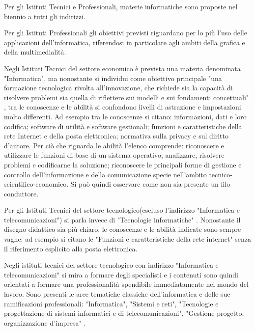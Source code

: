 \documentclass[12pt]{report}
\begin{document}
Per gli Istituti Tecnici e Professionali, materie informatiche sono proposte nel biennio a tutti gli indirizzi.

Per gli Istituti Professionali gli obiettivi previsti riguardano per lo più l'uso delle applicazioni dell'informatica, riferendosi in particolare agli ambiti della grafica e della multimedialità.

Negli Istituti Tecnici del settore economico è prevista una materia denominata "Informatica", ma nonostante si individui come obiettivo principale "una formazione tecnologica rivolta all'innovazione, che richiede sia la capacità di risolvere problemi sia quella di riflettere sui modelli e sui fondamenti concettuali" \cite{IndicazioniIstituti}, tra le conoscenze e le abilità si confondono livelli di astrazione e impostazioni molto differenti. Ad esempio tra le conoscenze si citano: informazioni, dati e loro codifica; software di utilità e software gestionali; funzioni e caratteristiche della rete Internet e della posta elettronica; normativa sulla privacy e sul diritto d'autore. Per ciò che riguarda le abilità l'elenco comprende: riconoscere e utilizzare le funzioni di base di un sistema operativo; analizzare, risolvere problemi e codificarne la soluzione; riconoscere le principali forme di gestione e controllo dell'informazione e della comunicazione specie nell'ambito tecnico-scientifico-economico. Si può quindi osservare come non sia presente un filo conduttore.

Per gli Istituti Tecnici del settore tecnologico(escluso l'indirizzo "Informatica e telecomunicazioni") si parla invece di "Tecnologie informatiche" . Nonostante il disegno didattico sia più chiaro, le conoscenze e le abilità indicate sono sempre vaghe: ad esempio si citano le "Funzioni e caratteristiche della rete internet" senza il riferimento esplicito alla posta elettronica. 

Negli istituti tecnici del settore tecnologico con indirizzo "Informatica e telecomunicazioni" si mira a formare degli specialisti e i contenuti sono quindi orientati a formare una professionalità spendibile immediatamente nel mondo del lavoro. 
Sono presenti le aree tematiche classiche dell'informatica e delle sue ramificazioni professionali: "Informatica", "Sistemi e reti", "Tecnologie e progettazione di sistemi informatici e di telecomunicazioni", "Gestione progetto, organizzazione d'impresa" . 

\end{document}
